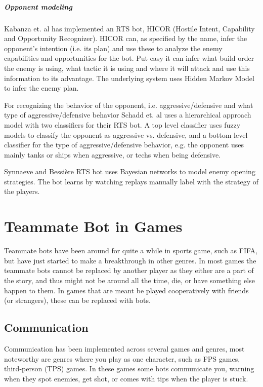 \subparagraph{Opponent modeling}
Kabanza et. al has implemented an RTS bot, HICOR (Hostile Intent, Capability and Opportunity Recognizer). HICOR can, as specified by the name, infer the opponent's intention (i.e. its plan) and use these to analyze the enemy capabilities and opportunities for the bot. Put easy it can infer what build order the enemy is using, what tactic it is using and where it will attack and use this information to its advantage. The underlying system uses Hidden Markov Model to infer the enemy plan.

For recognizing the behavior of the opponent, i.e. aggressive/defensive and what type of aggressive/defensive behavior Schadd et. al uses a hierarchical approach model with two classifiers for their RTS bot. A top level classifier uses fuzzy models to classify the opponent as aggressive vs. defensive, and a bottom level classifier for the type of aggressive/defensive behavior, e.g. the opponent uses mainly tanks or ships when aggressive, or techs when being defensive.

Synnaeve and Bessière RTS bot uses Bayesian networks to model enemy opening strategies\cite{synnaeve11}. The bot learns by watching replays manually label with the strategy of the players.

\section{Teammate Bot in Games}
Teammate bots have been around for quite a while in sports game, such as FIFA\cite{fifa}, but have just started to make a breakthrough in other genres. In most games\cite{callofduty, brotherinarms, rainbow6} the teammate bots cannot be replaced by another player as they either are a part of the story, and thus might not be around all the time, die, or have something else happen to them. In games that are meant be played cooperatively with friends (or strangers), these can be replaced with bots\cite{residentevil5, lostplanet2}.

\subsection{Communication}
\label{sec:game_communication}
Communication has been implemented across several games and genres, most noteworthy are genres where you play as one character, such as FPS games, third-person (TPS) games. In these games some bots communicate you, warning when they spot enemies, get shot, or comes with tips when the player is stuck.


